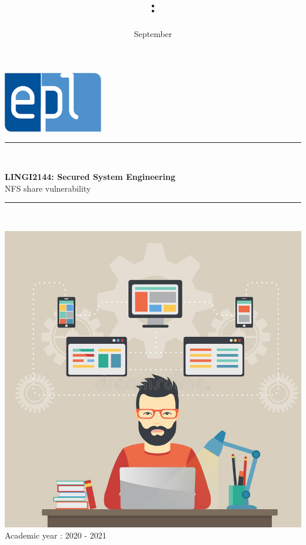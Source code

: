 \documentclass{article}
\title{\codecourse : \titlecourse}
\author{\othor}
\date{September \year}
\newcommand{\codecourse}{LINGI2144}
\newcommand{\titlecourse}{Secured System Engineering}
\newcommand{\ayear}{2020 - 2021}
\begin{document}
        \hfill\includegraphics[scale=0.5]{image/logoepl.png}
        
        \vspace*{\fill}
            
        \begin{center}
        
            \rule{1\textwidth}{1pt}\\
	            \vspace{0.5\baselineskip}
		            \begin{LARGE}
	                	\textbf{\codecourse : \titlecourse}\\
	                	NFS share vulnerability
		            \end{LARGE}
		        \vspace{0.5\baselineskip}       
	        \rule{1\textwidth}{1pt}\\
	        
	        \vspace{0.5\baselineskip}
	        
	        \includegraphics[scale=1.5]{image/MCP.jpg}\\

	        \vspace{0.5\baselineskip}
	            Academic year : \ayear\\
                
		\end{center}
		
\end{document}
